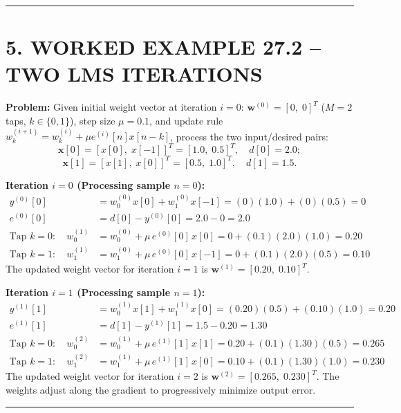 \documentclass[11pt,a4paper]{article}
\begin{document}
\noindent\rule{\textwidth}{0.5pt}

\section{5. WORKED EXAMPLE 27.2 -- TWO LMS ITERATIONS}

\textbf{Problem:} Given initial weight vector at iteration $i=0$: $\mathbf{w}^{(0)} = [0,\;0]^T$ ($M=2$ taps, $k \in \{0, 1\}$), step size $\mu = 0.1$, and update rule $w_k^{(i+1)} = w_k^{(i)} + \mu e^{(i)}[n] x[n-k]$, process the two input/desired pairs:
\[
\mathbf{x}[0] = [x[0],\; x[-1]]^T = [1.0,\; 0.5]^T,\quad d[0] = 2.0;
\]
\[
\mathbf{x}[1] = [x[1],\; x[0]]^T  = [0.5,\; 1.0]^T,\quad d[1] = 1.5.
\]

\noindent\textbf{Iteration $i=0$ (Processing sample $n=0$):}
\begin{align}
y^{(0)}[0] &= w_0^{(0)} x[0] + w_1^{(0)} x[-1] = (0)(1.0) + (0)(0.5) = 0 \\
e^{(0)}[0] &= d[0] - y^{(0)}[0] = 2.0 - 0 = 2.0 \\
\text{Tap } k=0: \quad w_0^{(1)} &= w_0^{(0)} + \mu\, e^{(0)}[0]\, x[0] = 0 + (0.1)(2.0)(1.0) = \mathbf{0.20} \\
\text{Tap } k=1: \quad w_1^{(1)} &= w_1^{(0)} + \mu\, e^{(0)}[0]\, x[-1] = 0 + (0.1)(2.0)(0.5) = \mathbf{0.10}
\end{align}
The updated weight vector for iteration $i=1$ is $\mathbf{w}^{(1)} = [0.20,\; 0.10]^T$.

\vspace{2mm}
\noindent\textbf{Iteration $i=1$ (Processing sample $n=1$):}
\begin{align}
y^{(1)}[1] &= w_0^{(1)} x[1] + w_1^{(1)} x[0] = (0.20)(0.5) + (0.10)(1.0) = 0.20 \\
e^{(1)}[1] &= d[1] - y^{(1)}[1] = 1.5 - 0.20 = \mathbf{1.30} \\
\text{Tap } k=0: \quad w_0^{(2)} &= w_0^{(1)} + \mu\, e^{(1)}[1]\, x[1] = 0.20 + (0.1)(1.30)(0.5) = \mathbf{0.265} \\
\text{Tap } k=1: \quad w_1^{(2)} &= w_1^{(1)} + \mu\, e^{(1)}[1]\, x[0] = 0.10 + (0.1)(1.30)(1.0) = \mathbf{0.230}
\end{align}
The updated weight vector for iteration $i=2$ is $\mathbf{w}^{(2)} = [0.265,\; 0.230]^T$. The weights adjust along the gradient to progressively minimize output error.

\noindent\rule{\textwidth}{0.5pt}
\end{document}
